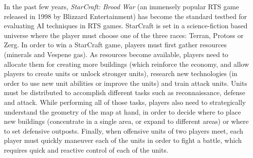 \documentclass{llncs}
\begin{document}
In the past few years, {\em StarCraft: Brood War} (an immensely popular  
RTS game released in 1998 by Blizzard  Entertainment) has become the 
standard testbed for evaluating AI techniques in RTS games.
StarCraft  is   set  in   a
science-fiction based universe where the player must choose one of the
three  races: Terran,  Protoss or  Zerg.  %
%
%
%
In order to win a StarCraft  game, players must first gather resources
(minerals  and Vespene  gas). As  resources become  available, players
need to allocate them for creating more buildings (which reinforce the
economy, and allow players to  create units or unlock stronger units),
research  new technologies  (in order  to  use new  unit abilities  or
improve the units)  and train attack units. Units  must be distributed
to  accomplish different  tasks  such as  reconnaissance, defense  and
attack.  While  performing all  of those tasks,  players also  need to
strategically understand the geometry of the  map at hand, in order to
decide where to place new buildings  (concentrate in a single area, or
expand  to  different  areas)  or where  to  set  defensive  outposts.
Finally, when  offensive units of  two players meet, each  player must
quickly maneuver each  of the units in order to  fight a battle, which
requires quick and reactive control of each of the units.
\end{document}
